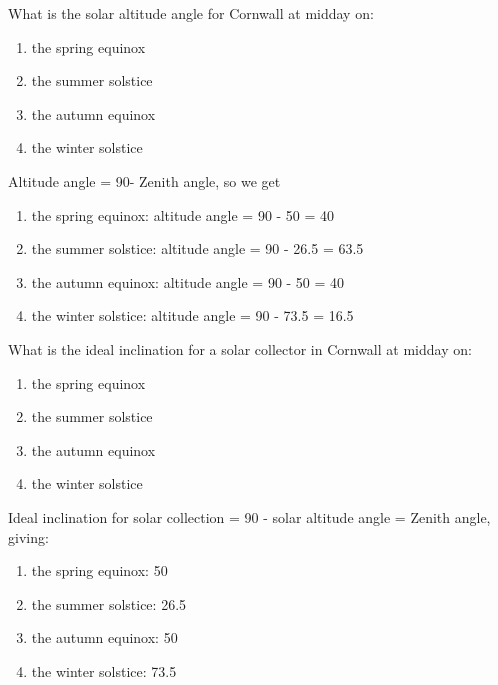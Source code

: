 \documentclass[class=scrartcl, crop=false,parskip=half]{standalone}
\begin{document}
\begin{question}
What is the solar altitude angle for Cornwall at midday on:
    \begin{enumerate}[label=\alph*)]
        \item the spring equinox
        \item the summer solstice
        \item the autumn equinox
        \item the winter solstice
    \end{enumerate}
\end{question}
\begin{solution}
Altitude angle = 90\degree - Zenith angle, so we get
    \begin{enumerate}[label=\alph*)]
        \item the spring equinox: altitude angle = 90 - 50 = 40\degree
        \item the summer solstice: altitude angle = 90 - 26.5 = 63.5\degree
        \item the autumn equinox: altitude angle = 90 - 50 = 40\degree
        \item the winter solstice: altitude angle = 90 -  73.5 = 16.5\degree
    \end{enumerate}
\end{solution}

\begin{question}
What is the ideal inclination for a solar collector in Cornwall at midday on:
    \begin{enumerate}[label=\alph*)]
        \item the spring equinox
        \item the summer solstice
        \item the autumn equinox
        \item the winter solstice
    \end{enumerate}
\end{question}
\begin{solution}
Ideal inclination for solar collection = 90 - solar altitude angle = Zenith angle, giving:
    \begin{enumerate}[label=\alph*)]
        \item the spring equinox: 50\degree
        \item the summer solstice: 26.5\degree
        \item the autumn equinox: 50\degree
        \item the winter solstice: 73.5\degree
    \end{enumerate}
\end{solution}
\end{document}
